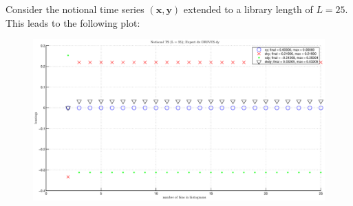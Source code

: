 \documentclass[a4paper,11pt]{article}
\begin{document}
Consider the notional time series $(\mathbf{x},\mathbf{y})$ extended to a library length of $L=25$.  This leads to the following plot:
\begin{figure}[!H]
\includegraphics[scale=0.55]{notionalTS.eps}
\end{figure}
\end{document}
